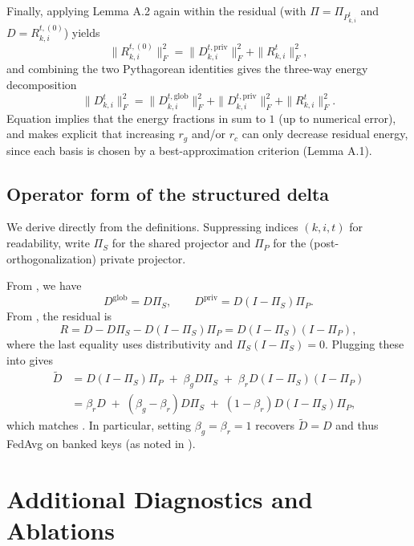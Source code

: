 \documentclass{article}
\theoremstyle{plain}
\theoremstyle{definition}
\theoremstyle{remark}
\begin{document}
Finally, applying Lemma A.2 again within the residual (with $\Pi=\Pi_{P_{k,i}^t}$ and $D=R_{k,i}^{t,(0)}$) yields
\[
\|R_{k,i}^{t,(0)}\|_F^2
= \|D_{k,i}^{t,\mathrm{priv}}\|_F^2 + \|R_{k,i}^t\|_F^2,
\]
and combining the two Pythagorean identities gives the three-way energy decomposition
\begin{equation}
\|D_{k,i}^t\|_F^2
= \|D_{k,i}^{t,\mathrm{glob}}\|_F^2
+ \|D_{k,i}^{t,\mathrm{priv}}\|_F^2
+ \|R_{k,i}^t\|_F^2.
\label{eq:appendix-threeway}
\end{equation}
Equation  implies that the energy fractions in  sum to $1$ (up to numerical error), and makes explicit that increasing $r_g$ and/or $r_c$ can only decrease residual energy, since each basis is chosen by a best-approximation criterion (Lemma A.1).

\subsection{Operator form of the structured delta}
\label{sec:appendix-operator}

We derive  directly from the definitions. Suppressing indices $(k,i,t)$ for readability, write $\Pi_S$ for the shared projector and $\Pi_P$ for the (post-orthogonalization) private projector.

From , we have
\[
D^{\mathrm{glob}} = D\Pi_S,\qquad
D^{\mathrm{priv}} = D(I-\Pi_S)\Pi_P.
\]
From , the residual is
\[
R = D - D\Pi_S - D(I-\Pi_S)\Pi_P
  = D(I-\Pi_S)(I-\Pi_P),
\]
where the last equality uses distributivity and $\Pi_S(I-\Pi_S)=0$. Plugging these into  gives
\begin{align*}
\tilde D
&= D(I-\Pi_S)\Pi_P \;+\; \beta_g D\Pi_S \;+\; \beta_r D(I-\Pi_S)(I-\Pi_P)\\
&= \beta_r D \;+\; (\beta_g-\beta_r)D\Pi_S \;+\; (1-\beta_r)D(I-\Pi_S)\Pi_P,
\end{align*}
which matches . In particular, setting $\beta_g=\beta_r=1$ recovers $\tilde D=D$ and thus FedAvg on banked keys (as noted in ).


\section{Additional Diagnostics and Ablations}
\label{sec:additional-ablations}
\end{document}
